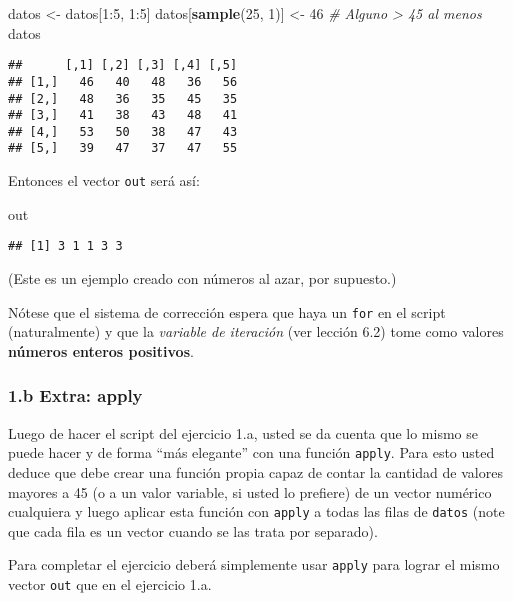 \documentclass[]{article}
\newenvironment{Shaded}{}{}
\newcommand{\KeywordTok}[1]{\textcolor[rgb]{0.00,0.44,0.13}{\textbf{{#1}}}}
\newcommand{\DecValTok}[1]{\textcolor[rgb]{0.25,0.63,0.44}{{#1}}}
\newcommand{\CommentTok}[1]{\textcolor[rgb]{0.38,0.63,0.69}{\textit{{#1}}}}
\newcommand{\NormalTok}[1]{{#1}}
\begin{document}
\begin{Shaded}
\begin{Highlighting}[]
\NormalTok{datos <- datos[}\DecValTok{1}\NormalTok{:}\DecValTok{5}\NormalTok{, }\DecValTok{1}\NormalTok{:}\DecValTok{5}\NormalTok{]}
\NormalTok{datos[}\KeywordTok{sample}\NormalTok{(}\DecValTok{25}\NormalTok{, }\DecValTok{1}\NormalTok{)] <- }\DecValTok{46}  \CommentTok{# Alguno > 45 al menos}
\NormalTok{datos}
\end{Highlighting}
\end{Shaded}
\begin{verbatim}
##      [,1] [,2] [,3] [,4] [,5]
## [1,]   46   40   48   36   56
## [2,]   48   36   35   45   35
## [3,]   41   38   43   48   41
## [4,]   53   50   38   47   43
## [5,]   39   47   37   47   55
\end{verbatim}
Entonces el vector \texttt{out} será así:

\begin{Shaded}
\begin{Highlighting}[]
\NormalTok{out}
\end{Highlighting}
\end{Shaded}
\begin{verbatim}
## [1] 3 1 1 3 3
\end{verbatim}
(Este es un ejemplo creado con números al azar, por supuesto.)

Nótese que el sistema de corrección espera que haya un \texttt{for} en
el script (naturalmente) y que la \emph{variable de iteración} (ver
lección 6.2) tome como valores \textbf{números enteros positivos}.

\subsubsection{1.b Extra: apply}

Luego de hacer el script del ejercicio 1.a, usted se da cuenta que lo
mismo se puede hacer y de forma ``más elegante'' con una función
\texttt{apply}. Para esto usted deduce que debe crear una función propia
capaz de contar la cantidad de valores mayores a 45 (o a un valor
variable, si usted lo prefiere) de un vector numérico cualquiera y luego
aplicar esta función con \texttt{apply} a todas las filas de
\texttt{datos} (note que cada fila es un vector cuando se las trata por
separado).

Para completar el ejercicio deberá simplemente usar \texttt{apply} para
lograr el mismo vector \texttt{out} que en el ejercicio 1.a.
\end{document}
